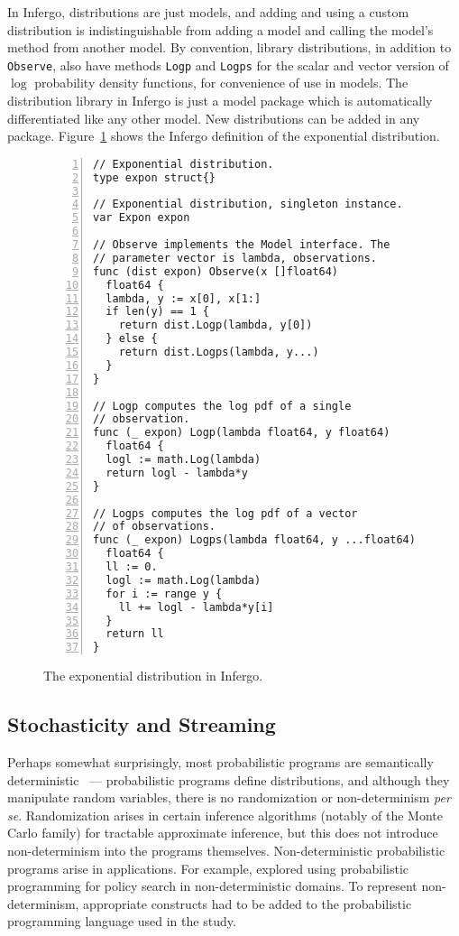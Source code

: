 \documentclass[sigplan,review,10pt,anonymous]{acmart}
\begin{document}
\begin{sloppypar}
In Infergo, distributions are just models, and adding and using
a custom distribution is indistinguishable from adding a model
and calling the model's method from another model. By
convention, library distributions, in addition to
\lstinline{Observe}, also have methods \lstinline{Logp} and
\lstinline{Logps} for the scalar and vector version of $\log$
probability density functions, for convenience of use in models.
The distribution library in Infergo is just a model package
which is automatically differentiated like any other model.  New
distributions can be added in any package.
Figure~\ref{fig:exponential-distribution} shows the Infergo
definition of the exponential distribution.
\begin{figure}
  \begin{lstlisting}[framexleftmargin=10pt,numbers=left]
// Exponential distribution.
type expon struct{}

// Exponential distribution, singleton instance.
var Expon expon

// Observe implements the Model interface. The
// parameter vector is lambda, observations.
func (dist expon) Observe(x []float64)
  float64 {
  lambda, y := x[0], x[1:]
  if len(y) == 1 {
    return dist.Logp(lambda, y[0])
  } else {
    return dist.Logps(lambda, y...)
  }
}

// Logp computes the log pdf of a single
// observation.
func (_ expon) Logp(lambda float64, y float64)
  float64 {
  logl := math.Log(lambda)
  return logl - lambda*y
}

// Logps computes the log pdf of a vector
// of observations.
func (_ expon) Logps(lambda float64, y ...float64)
  float64 {
  ll := 0.
  logl := math.Log(lambda)
  for i := range y {
    ll += logl - lambda*y[i]
  }
  return ll
}
  \end{lstlisting}
  \caption{The exponential distribution in Infergo.}
  \label{fig:exponential-distribution}
\end{figure}

\subsection{Stochasticity and Streaming}

Perhaps somewhat surprisingly, most probabilistic programs are
semantically deterministic~\cite{SYW+16} --- probabilistic programs
define distributions, and although they manipulate random
variables, there is no randomization or non-determinism
\textit{per se}. Randomization arises in certain inference
algorithms (notably of the Monte Carlo family) for tractable
approximate inference, but this does not introduce
non-determinism into the programs themselves. Non-deterministic
probabilistic programs arise in applications. For example,
\citet{MPT+16} explored using probabilistic programming for
policy search in non-deterministic domains. To represent
non-determinism, appropriate constructs had to be added to the
probabilistic programming language used in the study.


\end{sloppypar}
\end{document}
